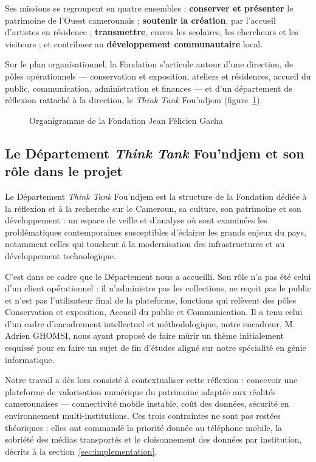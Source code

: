 Ses missions se regroupent en quatre ensembles : \textbf{conserver et présenter}
le patrimoine de l'Ouest camerounais ; \textbf{soutenir la création}, par
l'accueil d'artistes en résidence ; \textbf{transmettre}, envers les scolaires,
les chercheurs et les visiteurs ; et contribuer au \textbf{développement
communautaire} local.

Sur le plan organisationnel, la Fondation s'articule autour d'une direction, de
pôles opérationnels — conservation et exposition, ateliers et résidences,
accueil du public, communication, administration et finances — et d'un
département de réflexion rattaché à la direction, le \emph{Think Tank}
Fou'ndjem (figure~\ref{fig:organigramme}).

\begin{figure}[htbp]
\centering
{}
\caption{Organigramme de la Fondation Jean Félicien Gacha}
\label{fig:organigramme}
\end{figure}

\subsection{Le Département \emph{Think Tank} Fou'ndjem et son rôle dans le projet}
\label{sec:thinktank}

Le Département \emph{Think Tank} Fou'ndjem est la structure de la Fondation
dédiée à la réflexion et à la recherche sur le Cameroun, sa culture, son
patrimoine et son développement : un espace de veille et d'analyse où sont
examinées les problématiques contemporaines susceptibles d'éclairer les grands
enjeux du pays, notamment celles qui touchent à la modernisation des
infrastructures et au développement technologique.

C'est dans ce cadre que le Département nous a accueilli. Son rôle n'a pas été
celui d'un client opérationnel : il n'administre pas les collections, ne reçoit
pas le public et n'est pas l'utilisateur final de la plateforme, fonctions qui
relèvent des pôles Conservation et exposition, Accueil du public et
Communication. Il a tenu celui d'un cadre d'encadrement intellectuel et
méthodologique, notre encadreur, M. Adrien GHOMSI, nous ayant proposé de faire
mûrir un thème initialement esquissé pour en faire un sujet de fin d'études
aligné sur notre spécialité en génie informatique.

Notre travail a dès lors consisté à contextualiser cette réflexion : concevoir
une plateforme de valorisation numérique du patrimoine adaptée aux réalités
camerounaises — connectivité mobile instable, coût des données, sécurité en
environnement multi-institutions. Ces trois contraintes ne sont pas restées
théoriques : elles ont commandé la priorité donnée au téléphone mobile, la
sobriété des médias transportés et le cloisonnement des données par
institution, décrits à la section~\ref{sec:implementation}.


